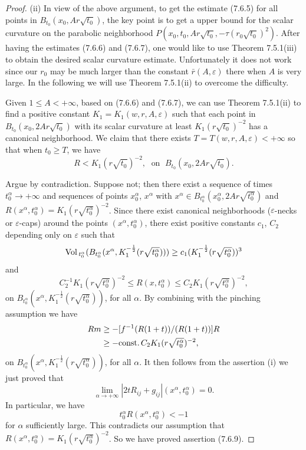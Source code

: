 \begin{proof}
\medskip
(ii) In view of the above argument, to get the estimate (7.6.5)
for all points in $B_{t_0}(x_0,Ar\sqrt{t_0})$, the key point is to
get a upper bound for the scalar curvature on the parabolic
neighborhood $P(x_0,t_0,Ar\sqrt{t_0},-\tau(r_0\sqrt{t_0})^2)$.
After having the estimates (7.6.6) and (7.6.7), one would like to
use Theorem 7.5.1(iii) to obtain the desired scalar curvature
estimate. Unfortunately it does not work since our $r_0$ may be
much larger than the constant $\bar{r}(A,\varepsilon)$ there when
$A$ is very large. In the following we will use Theorem 7.5.1(ii)
to overcome the difficulty.

Given $1 \leq A<+\infty$, based on (7.6.6) and (7.6.7), we can use
Theorem 7.5.1(ii) to find a positive constant
$K_1=K_1(w,r,A,\varepsilon)$ such that each point in
$B_{t_0}(x_0,2Ar\sqrt{t_0})$ with its scalar curvature at least
$K_1(r\sqrt{t_0})^{-2}$ has a canonical neighborhood. We claim
that there exists $T=T(w,r,A,\varepsilon)<+\infty$ so that when
$t_0\geq T$, we have \begin{equation} R<K_1(r\sqrt{t_0})^{-2},\; \mbox{ on } \;
B_{t_0}(x_0,2Ar\sqrt{t_0}). %
\end{equation}

Argue by contradiction. Suppose not; then there exist a sequence
of times $t^{\alpha}_0\rightarrow+\infty$ and sequences of points
$x^{\alpha}_0$, $x^{\alpha}$ with $x^{\alpha}\in
B_{t^{\alpha}_0}(x^{\alpha}_0,2Ar\sqrt{t^{\alpha}_0})$ and
$R(x^{\alpha},t^{\alpha}_0)=K_1(r\sqrt{t^{\alpha}_0})^{-2}$. Since
there exist canonical neighborhoods ($\varepsilon$-necks or
$\varepsilon$-caps) around the points $(x^{\alpha},t^{\alpha}_0)$,
there exist positive constants $c_1$, $C_2$ depending only on
$\varepsilon$ such that
$$
{\rm Vol}\,_{t^{\alpha}_0}(B_{t^{\alpha}_0}(x^{\alpha},
K^{-\frac{1}{2}}_1(r\sqrt{t^{\alpha}_0})))\geq
c_1(K^{-\frac{1}{2}}_1(r\sqrt{t^{\alpha}_0}))^3
$$
and
$$
C^{-1}_2K_1(r\sqrt{t^{\alpha}_0})^{-2} \leq R(x,t^{\alpha}_0) \leq
C_2K_1(r\sqrt{t^{\alpha}_0})^{-2},
$$
on $B_{t^{\alpha}_0} (x^{\alpha}, K^{-\frac{1}{2}}_1
(r\sqrt{t^{\alpha}_0}))$, for all $\alpha$. By combining with the
pinching assumption we have
\begin{align*}
Rm&  \geq-[f^{-1}(R(1+t))/(R(1+t))]R\\
&  \geq -{\rm const.}\, C_2K_1(r\sqrt{t^{\alpha}_0})^{-2},
\end{align*}
on
$B_{t^{\alpha}_0}(x^{\alpha},K^{-\frac{1}{2}}_1(r\sqrt{t^{\alpha}_0}))$,
for all $\alpha$. It then follows from the assertion (i) we just
proved that
$$
\lim_{\alpha\rightarrow+\infty}|2tR_{ij}+g_{ij}|
(x^{\alpha},t^{\alpha}_0)=0.
$$
In particular, we have
$$
t^{\alpha}_0R(x^{\alpha},t^{\alpha}_0)<-1
$$
for $\alpha$ sufficiently large. This contradicts our assumption
that $R(x^{\alpha},t^{\alpha}_0)=K_1(r\sqrt{t^{\alpha}_0})^{-2}$.
So we have proved assertion (7.6.9).


\end{proof}
